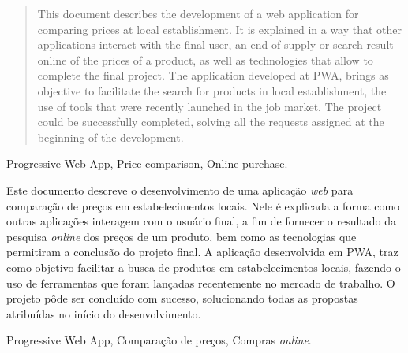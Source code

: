 \begin{abstract}
This document describes the development of a web application for comparing prices at local establishment. It is explained in a way that other applications interact with the final user, an end of supply or search result  online of the prices of a product, as well as technologies that allow to complete the final project. The application developed at PWA, brings as objective to facilitate the search for products in local establishment, the use of tools that were recently launched in the job market. The project could be successfully completed, solving all the requests assigned at the beginning of the development.
\end{abstract}
\begin{keywords}
Progressive Web App, Price comparison, Online purchase.
\end{keywords}

\begin{resumo}
Este documento descreve o desenvolvimento de uma aplicação \textit{web} para comparação de preços em estabelecimentos locais. Nele é explicada a forma como outras aplicações interagem com o usuário final, a fim de fornecer o resultado da pesquisa \textit{online} dos preços de um produto, bem como as tecnologias que permitiram a conclusão do projeto final. A aplicação desenvolvida em PWA, traz como objetivo facilitar a busca de produtos em estabelecimentos locais, fazendo o uso de ferramentas que foram lançadas recentemente no mercado de trabalho. O projeto pôde ser concluído com sucesso, solucionando todas as propostas atribuídas no início do desenvolvimento. 
\end{resumo}

\begin{palavrasChaves}
Progressive Web App, Comparação de preços, Compras \textit{online}.
\end{palavrasChaves}

